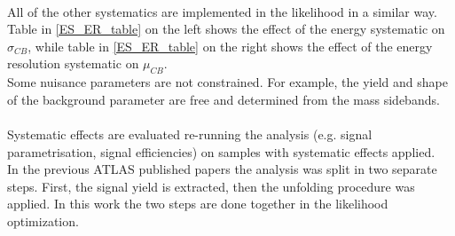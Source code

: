 \\
All of the other systematics are implemented in the likelihood in a similar way.
\\
Table in \ref{ES_ER_table} on the left shows the effect of the energy systematic on $\sigma_{CB}$, while table  in \ref{ES_ER_table} on the right shows the effect of the energy resolution systematic on $\mu_{CB}$.
\\
Some nuisance parameters are not constrained. For example, the yield and shape of the background parameter are free and determined from the mass sidebands.
\\\\
Systematic effects are evaluated re-running the analysis (e.g. signal parametrisation, signal efficiencies) on samples with systematic effects applied.
\\
In the previous ATLAS published papers the analysis was split in two separate steps. First, the signal yield is extracted, then the unfolding procedure was applied. In this work the two steps are done together in the likelihood optimization.


